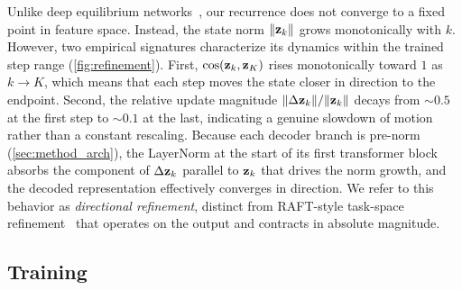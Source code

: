 Unlike deep equilibrium networks~\citep{bai2019deep}, our recurrence does not converge to a fixed point in feature space. Instead, the state norm $\|\mathbf{z}_k\|$ grows monotonically with $k$.
However, two empirical signatures characterize its dynamics within the trained step range (\cref{fig:refinement}).
First, $\cos(\mathbf{z}_k, \mathbf{z}_K)$ rises monotonically toward $1$ as $k \to K$, which means that each step moves the state closer in direction to the endpoint.
Second, the relative update magnitude $\|\Delta \mathbf{z}_k\|/\|\mathbf{z}_k\|$ decays from $\sim 0.5$ at the first step to $\sim 0.1$ at the last, indicating a genuine slowdown of motion rather than a constant rescaling.
Because each decoder branch is pre-norm (\cref{sec:method_arch}), the LayerNorm at the start of its first transformer block absorbs the component of $\Delta \mathbf{z}_k$ parallel to $\mathbf{z}_k$ that drives the norm growth, and the decoded representation effectively converges in direction. 
We refer to this behavior as \emph{directional refinement}, distinct from RAFT-style task-space refinement~\citep{RAFT} that operates on the output and contracts in absolute magnitude.




\subsection{Training}
\label{sec:method_training}

